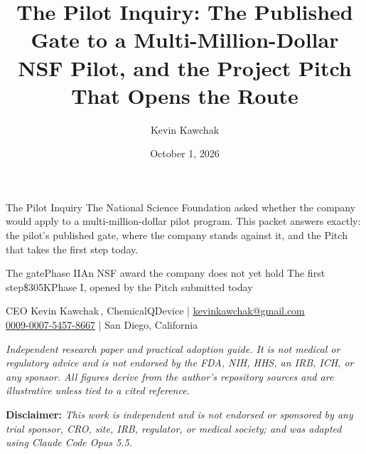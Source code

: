 \documentclass[11pt]{article}
\title{The Pilot Inquiry: The Published Gate to a Multi-Million-Dollar NSF Pilot, and the Project Pitch That Opens the Route}
\author{Kevin Kawchak}
\date{October 1, 2026}
\begin{document}
\thispagestyle{plain}

%
{The Pilot Inquiry}%
{The National Science Foundation asked whether the company would apply to a
multi-million-dollar pilot program. This packet answers exactly: the pilot's published
gate, where the company stands against it, and the Pitch that takes the first step today.}

\vspace{0.15em}

\begin{center}
 \enspace {} \enspace
{} \enspace {} \enspace
{}
\end{center}

\vspace{-0.15em}

%
{The gate}{Phase II}{An NSF award the company does not yet hold}%
{The first step}{\$305K}{Phase I, opened by the Pitch submitted today}

\vspace{-0.1em}
\apprule{0.9pt}

\begin{center}\small
CEO Kevin Kawchak\,, ChemicalQDevice \;|\;
\href{mailto:kevinkawchak@gmail.com}{kevinkawchak@gmail.com}\\
\href{https://orcid.org/0009-0007-5457-8667}{0009-0007-5457-8667} \;|\;
San Diego, California
\end{center}

\vspace{-0.25em}
\apprule{0.5pt}

\noindent\footnotesize\textit{Independent research paper and practical adoption
guide. It is not medical or regulatory advice and is not endorsed by the FDA,
NIH, HHS, an IRB, ICH, or any sponsor. All figures derive from the author's
repository sources and are illustrative unless tied to a cited
reference.}\normalsize\par

\vspace{0.12em}

\noindent\footnotesize\textbf{Disclaimer:} \textit{This work is independent and
is not endorsed or sponsored by any trial sponsor, CRO, site, IRB, regulator, or
medical society; and was adapted using Claude Code Opus 5.5.}\normalsize\par
\end{document}
